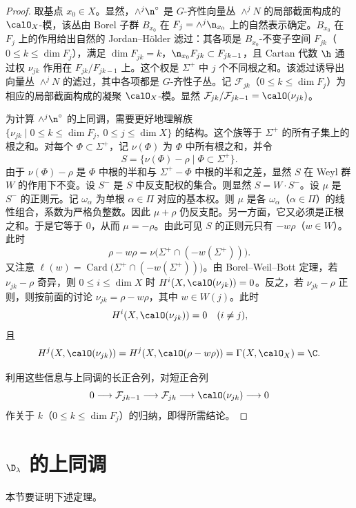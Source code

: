 \begin{proof}
取基点 $x_0\in X$。显然，$\wedge^j\n^\circ$ 是 $G$-齐性向量丛 $\wedge^jN$ 的局部截面构成的 $\calO_X$-模，该丛由 Borel 子群 $B_{x_0}$ 在 $F_j=\wedge^j\n_{x_0}$ 上的自然表示确定。$B_{x_0}$ 在 $F_j$ 上的作用给出自然的 Jordan--H\"older 滤过：其各项是 $B_{x_0}$-不变子空间 $F_{jk}$（$0\le k\le\dim F_j$），满足 $\dim F_{jk}=k$，$\n_{x_0}F_{jk}\subset F_{jk-1}$，且 Cartan 代数 $\h$ 通过权 $\nu_{jk}$ 作用在 $F_{jk}/F_{jk-1}$ 上。这个权是 $\Sigma^+$ 中 $j$ 个不同根之和。该滤过诱导出向量丛 $\wedge^jN$ 的滤过，其中各项都是 $G$-齐性子丛。记 $\mathcal{F}_{jk}$（$0\le k\le\dim F_j$）为相应的局部截面构成的凝聚 $\calO_X$-模。显然 $\mathcal{F}_{jk}/\mathcal{F}_{jk-1}=\calO(\nu_{jk})$。

为计算 $\wedge^j\n^\circ$ 的上同调，需要更好地理解族 $\{\nu_{jk}\mid 0\le k\le\dim F_j,\ 0\le j\le\dim X\}$ 的结构。这个族等于 $\Sigma^+$ 的所有子集上的根之和。对每个 $\Phi\subset\Sigma^+$，记 $\nu(\Phi)$ 为 $\Phi$ 中所有根之和，并令
\[
S=\{\nu(\Phi)-\rho\mid\Phi\subset\Sigma^+\}.
\]
由于 $\nu(\Phi)-\rho$ 是 $\Phi$ 中根的半和与 $\Sigma^+-\Phi$ 中根的半和之差，显然 $S$ 在 Weyl 群 $W$ 的作用下不变。设 $S^-$ 是 $S$ 中反支配权的集合。则显然 $S=W\cdot S^-$。设 $\mu$ 是 $S^-$ 的正则元。记 $\omega_\alpha$ 为单根 $\alpha\in\Pi$ 对应的基本权。则 $\mu$ 是各 $\omega_\alpha$（$\alpha\in\Pi$）的线性组合，系数为严格负整数。因此 $\mu+\rho$ 仍反支配。另一方面，它又必须是正根之和。于是它等于 $0$，从而 $\mu=-\rho$。由此可见 $S$ 的正则元只有 $-w\rho$（$w\in W$）。此时
\[
\rho-w\rho=\nu\bigl(\Sigma^+\cap(-w(\Sigma^+))\bigr).
\]
又注意 $\ell(w)=\operatorname{Card}\bigl(\Sigma^+\cap(-w(\Sigma^+))\bigr)$。由 Borel--Weil--Bott 定理，若 $\nu_{jk}-\rho$ 奇异，则 $0\le i\le\dim X$ 时 $H^i(X,\calO(\nu_{jk}))=0$。反之，若 $\nu_{jk}-\rho$ 正则，则按前面的讨论 $\nu_{jk}=\rho-w\rho$，其中 $w\in W(j)$。此时
\[
H^i(X,\calO(\nu_{jk}))=0\quad(i\neq j),
\]
且
\[
H^j(X,\calO(\nu_{jk}))=H^j(X,\calO(\rho-w\rho))=\Gamma(X,\calO_X)=\C .
\]

利用这些信息与上同调的长正合列，对短正合列
\[
0\longrightarrow\mathcal{F}_{jk-1}\longrightarrow\mathcal{F}_{jk}\longrightarrow\calO(\nu_{jk})\longrightarrow 0
\]
作关于 $k$（$0\le k\le\dim F_j$）的归纳，即得所需结论。
\end{proof}

\section{$\D_\lambda$ 的上同调}
\label{sec:02.2.6}

本节要证明下述定理。

